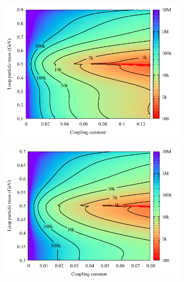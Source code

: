 \documentclass[10pt]{article}
\theoremstyle{definition}
\theoremstyle{remark}
\begin{document}
	\begin{figure}[h]
		\centering
		\begin{subfigure}{0.3\textwidth}
			\centering
			\includegraphics[width=\textwidth]{unbinned_0.4GeV.pdf}
			\caption{}
		\end{subfigure}
		\begin{subfigure}{0.3\textwidth}
			\centering
			\includegraphics[width=\textwidth]{unbinned_0.2GeV.pdf}
			\caption{}
		\end{subfigure}
		\vfill
		\begin{subfigure}{0.3\textwidth}
			\centering

\end{subfigure}
\end{figure}
\end{document}
